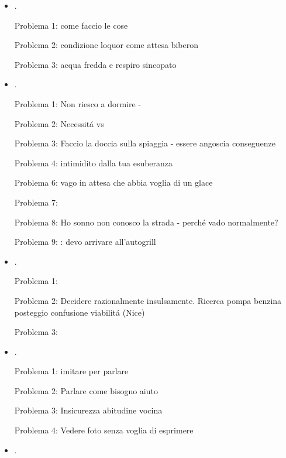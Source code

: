 \begin{itemize}
Problema 3: me totalizzato dalle necessit\'a

Problema 4: costrizione bronchiale trazioni

Problema 5: crollo

\item {}.

Problema 1: come faccio le cose

Problema 2: condizione loquor come  attesa biberon

Problema 3: acqua fredda e respiro sincopato


\item {}.

Problema 1: Non riesco a dormire - 

Problema 2: Necessit\'a vs 

Problema 3: Faccio la doccia sulla spiaggia - essere angoscia conseguenze

Problema 4: intimidito dalla tua esuberanza

Problema 6: vago in attesa che abbia voglia di un glace

Problema 7: 

Problema 8: Ho sonno non conosco la strada - perch\'e vado normalmente?

Problema 9: : devo arrivare all'autogrill

\item {}.

Problema 1: 

Problema 2: Decidere razionalmente insulsamente. Ricerca pompa benzina posteggio confusione viabilit\'a (Nice)

Problema 3: 

\item {}.

Problema 1: imitare per parlare

Problema 2: Parlare come bisogno aiuto

Problema 3: Insicurezza abitudine vocina

Problema 4: Vedere foto senza voglia di esprimere

\item {}.


\end{itemize}
